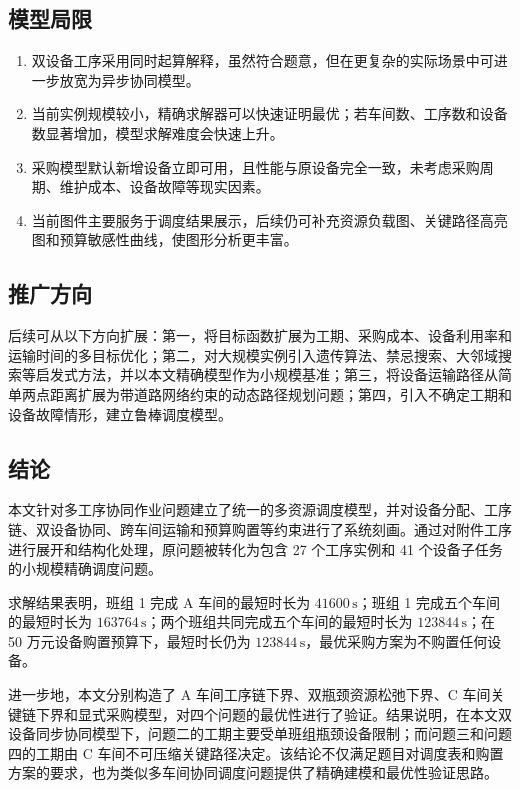 \subsection{模型局限}

\begin{enumerate}
  \item 双设备工序采用同时起算解释，虽然符合题意，但在更复杂的实际场景中可进一步放宽为异步协同模型。
  \item 当前实例规模较小，精确求解器可以快速证明最优；若车间数、工序数和设备数显著增加，模型求解难度会快速上升。
  \item 采购模型默认新增设备立即可用，且性能与原设备完全一致，未考虑采购周期、维护成本、设备故障等现实因素。
  \item 当前图件主要服务于调度结果展示，后续仍可补充资源负载图、关键路径高亮图和预算敏感性曲线，使图形分析更丰富。
\end{enumerate}

\subsection{推广方向}

后续可从以下方向扩展：第一，将目标函数扩展为工期、采购成本、设备利用率和运输时间的多目标优化；第二，对大规模实例引入遗传算法、禁忌搜索、大邻域搜索等启发式方法，并以本文精确模型作为小规模基准；第三，将设备运输路径从简单两点距离扩展为带道路网络约束的动态路径规划问题；第四，引入不确定工期和设备故障情形，建立鲁棒调度模型。

\subsection{结论}

本文针对多工序协同作业问题建立了统一的多资源调度模型，并对设备分配、工序链、双设备协同、跨车间运输和预算购置等约束进行了系统刻画。通过对附件工序进行展开和结构化处理，原问题被转化为包含 27 个工序实例和 41 个设备子任务的小规模精确调度问题。

求解结果表明，班组 1 完成 A 车间的最短时长为 $41600\,\mathrm{s}$；班组 1 完成五个车间的最短时长为 $163764\,\mathrm{s}$；两个班组共同完成五个车间的最短时长为 $123844\,\mathrm{s}$；在 50 万元设备购置预算下，最短时长仍为 $123844\,\mathrm{s}$，最优采购方案为不购置任何设备。

进一步地，本文分别构造了 A 车间工序链下界、双瓶颈资源松弛下界、C 车间关键链下界和显式采购模型，对四个问题的最优性进行了验证。结果说明，在本文双设备同步协同模型下，问题二的工期主要受单班组瓶颈设备限制；而问题三和问题四的工期由 C 车间不可压缩关键路径决定。该结论不仅满足题目对调度表和购置方案的要求，也为类似多车间协同调度问题提供了精确建模和最优性验证思路。

